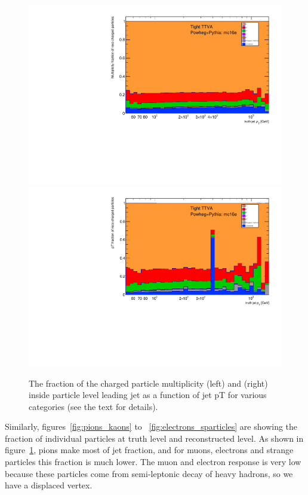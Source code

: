 \begin{figure}[b]
\centering
\includegraphics[scale=0.38, page=2]{figures/jetcompstudy_MultiplicityFraction.pdf}
\includegraphics[scale=0.38, page=2]{figures/jet_comp_study_powheg_Tight_pTFraction_mc16e.pdf}%
\caption {The fraction of the charged particle multiplicity (left) and \pT (right) inside particle level leading jet as a function of jet pT for various categories (see the text for details).}
\label{fig:chargedparticles_truthjet}
\end{figure}

Similarly, figures~\ref{fig:pions_kaons} to ~\ref{fig:electrons_sparticles} are showing the fraction of individual particles at truth level and reconstructed level. As shown in figure~\ref{fig:chargedparticles_truthjet}, pions make most of jet fraction, and for muons, electrons and strange particles this fraction is much lower. The muon and electron response is very low because these particles come from semi-leptonic decay of heavy hadrons, so we have a displaced vertex.

